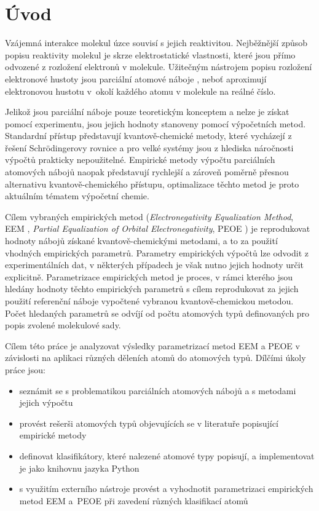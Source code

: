 \chapter{Úvod}
\setcounter{page}{1}
Vzájemná interakce molekul úzce souvisí s jejich reaktivitou.
Nejběžnější způsob popisu reaktivity molekul je skrze  elektrostatické vlastnosti, které jsou pří\-mo odvozené z rozložení elektronů v molekule. Užitečným nástrojem popisu rozložení elektronové hustoty jsou parciální atomové náboje \cite{Atkins}, neboť aproximují elektronovou hustotu v~o\-kolí každého atomu v molekule na reálné číslo.

Jelikož jsou parciální náboje pouze teoretickým konceptem a nelze je získat pomocí experimentu, jsou jejich hodnoty stanoveny pomocí výpočetních metod. Standardní přístup představují kvantově-chemické metody, které vycházejí z řešení Schrödingerovy rovnice \cite{Volatron} a pro velké systémy jsou z hlediska náročnosti výpočtů prakticky nepoužitelné. Empirické metody výpočtu parciálních atomových nábojů naopak představují rychlejší a zároveň poměrně přesnou alternativu kvantově-chemické\-ho přístupu, optimalizace těchto metod je proto aktuálním tématem výpočetní chemie. 

Cílem vybraných empirických metod (\textit{Electronegativity Equalization Method}, EEM \cite{eem}, \textit{Partial Equalization of Orbital Electronegativity}, PEOE \cite{GM}) je reprodukovat hodnoty nábojů získané kvantově-chemickými metodami, a to za použití vhodných empirických parametrů. Parametry empirických výpočtů lze odvodit z experimentálních dat, v některých případech je však nutno jejich hodnoty určit explicitně. Parametrizace empirických metod je proces, v rámci kterého jsou hledány hodnoty těchto empirických parametrů s cílem reprodukovat za jejich použití referenční náboje vypočtené vybranou kvantově-chemickou metodou. Počet hledaných parametrů se odvíjí od počtu atomových typů definovaných pro popis zvolené molekulové sady. 

Cílem této práce je analyzovat výsledky parametrizací metod EEM a PEOE v závislosti na aplikaci různých děleních atomů do atomových typů.
Dílčími úkoly práce jsou:
\begin{itemize}
    \item seznámit se s problematikou parciálních atomových nábojů a s metodami jejich výpočtu
    \item provést rešerši atomových typů objevujících se v literatuře popisující empirické metody
    \item definovat klasifikátory, které nalezené atomové typy popisují, a implementovat je jako knihovnu jazyka Python
    \item s využitím externího nástroje provést a vyhodnotit parametrizaci empirických metod EEM a~PEOE při zavedení různých klasifikací atomů
\end{itemize}


